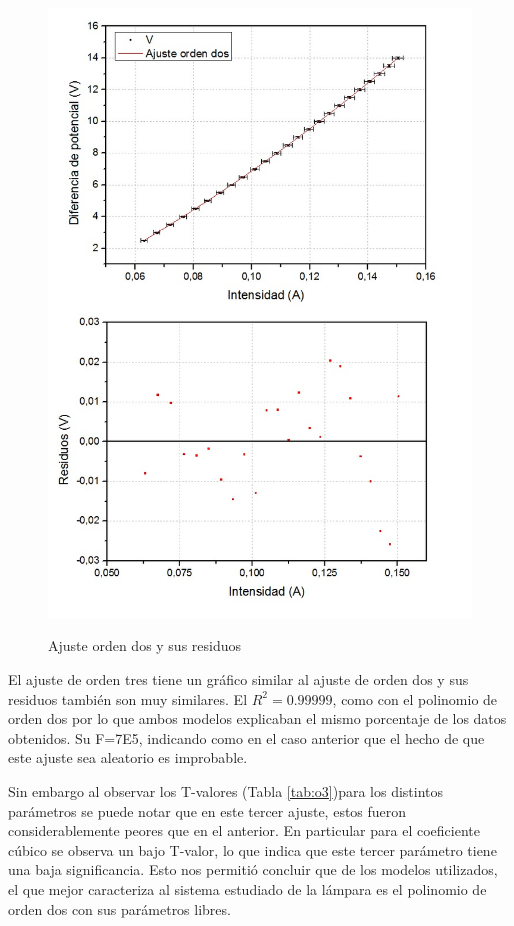 \documentclass[twoside,twocolumn,a4paper]{article}
\begin{document}
\begin{figure}[h]
\includegraphics[width=\linewidth]{fig_o2.jpg}
\label{fig:o2}
\caption{Ajuste orden dos y sus residuos}
\end{figure}



El ajuste de orden tres tiene un gr\'afico similar al ajuste de orden dos y sus residuos tambi\'en son muy similares. El $R^2=0.99999$, como con el polinomio de orden dos por lo que ambos modelos explicaban el mismo porcentaje de los datos obtenidos. Su F=7E5, indicando como en el caso anterior que el hecho de que este ajuste sea aleatorio es improbable.\par

Sin embargo al observar los T-valores (Tabla \ref{tab:o3})para los distintos par\'ametros se puede notar que en este tercer ajuste, estos fueron considerablemente peores que en el anterior. En particular para el coeficiente c\'ubico se observa un bajo T-valor, lo que indica que este tercer par\'ametro tiene una baja significancia. Esto nos permiti\'o concluir que de los modelos utilizados, el que mejor caracteriza al sistema estudiado de la l\'ampara es el polinomio de orden dos con sus par\'ametros libres.\par
\end{document}
